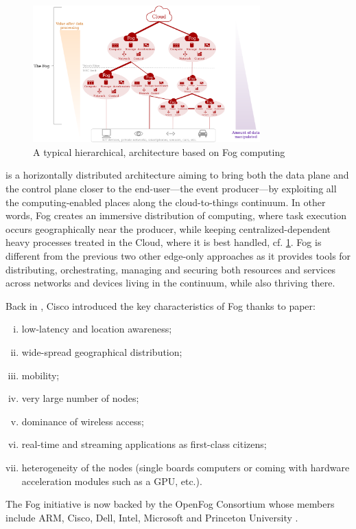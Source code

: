 \begin{description}[leftmargin=10pt]
		\begin{figure}[t]
			\centering
			\includegraphics[width=0.78\textwidth]{./assets/FogArchitecture.drawio.png}
			\caption{A typical hierarchical, architecture based on Fog computing \cite{ieee_standards_association_ieee_2018}}
			\label{fig:fog_archi}
		\end{figure}

	\item[Fog computing] is a horizontally distributed architecture aiming to bring both the data plane and the control plane closer to the end-user—the event producer—by exploiting all the computing-enabled places along the cloud-to-things continuum. In other words, Fog creates an immersive distribution of computing, where task execution occurs geographically near the producer, while keeping centralized-dependent heavy processes treated in the Cloud, where it is best handled, cf. \cref{fig:fog_archi}. Fog is different from the previous two other edge-only approaches as it provides tools for distributing, orchestrating, managing and securing both resources and services across networks and devices living in the continuum, while also thriving there.

		Back in , Cisco introduced the key characteristics of Fog thanks to  paper:
		\begin{enumerate}[(i)]
			\item low-latency and location awareness;
			\item wide-spread geographical distribution;
			\item mobility;
			\item very large number of nodes;
			\item dominance of wireless access;
			\item real-time and streaming applications as first-class citizens;
			\item heterogeneity of the nodes (single boards computers or coming with hardware acceleration modules such as a \gls{GPU}, etc.).
		\end{enumerate}
		The Fog initiative is now backed by the OpenFog Consortium \cite{ieee_standards_association_ieee_2018} whose members include ARM, Cisco, Dell, Intel, Microsoft and Princeton University \cite{chiang_fog_2016}.
\end{description}


